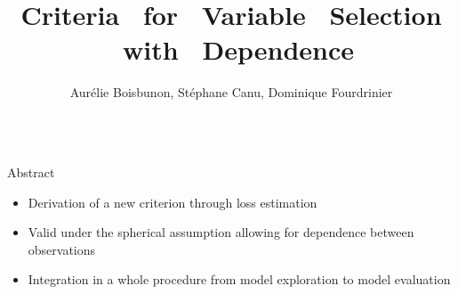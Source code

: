 \documentclass[,table]{beamer}
\title{Criteria \ for \ Variable \ Selection \ with \ Dependence}
\author[Boisbunon et al.]{Aurélie Boisbunon, Stéphane Canu, Dominique Fourdrinier}
\institute[LITIS]{Université de Rouen and INSA de Rouen}
\newcommand{\exemple}[1]{\textcolor{vertL!92!black}{#1}} %
\begin{document}
\begin{frame}{} 
  \begin{columns}
    \begin{column}{0.70\linewidth}
      \begin{block}{Abstract}
        \begin{itemize} 
        \item Derivation of a new criterion through \exemple{loss
            estimation}
        \item Valid under the \alert{spherical} assumption allowing
          for \alert{dependence} between observations
        \item Integration in a whole procedure from model
          exploration to model evaluation
        \end{itemize}
      \end{block}
    \end{column}
  \end{columns}



\end{frame}
\end{document}
